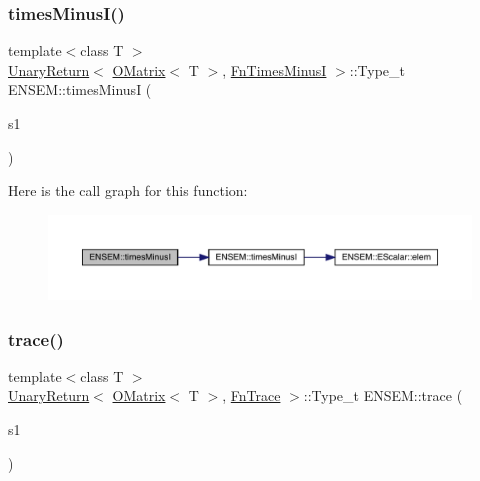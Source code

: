 \subsubsection{\texorpdfstring{timesMinusI()}{timesMinusI()}}
{\footnotesize\ttfamily template$<$class T $>$ \\
\mbox{\hyperlink{structENSEM_1_1UnaryReturn}{Unary\+Return}}$<$ \mbox{\hyperlink{classENSEM_1_1OMatrix}{O\+Matrix}}$<$ T $>$, \mbox{\hyperlink{structENSEM_1_1FnTimesMinusI}{Fn\+Times\+MinusI}} $>$\+::Type\+\_\+t E\+N\+S\+E\+M\+::times\+MinusI (\begin{DoxyParamCaption}\item[{const \mbox{\hyperlink{classENSEM_1_1OMatrix}{O\+Matrix}}$<$ T $>$ \&}]{s1 }\end{DoxyParamCaption})\hspace{0.3cm}{\ttfamily [inline]}}

Here is the call graph for this function\+:\nopagebreak
\begin{figure}[H]
\begin{center}
\leavevmode
\includegraphics[width=350pt]{d8/d55/group__obsmatrix_ga2c4879d53ca01a4233b94574e3c93b4f_cgraph}
\end{center}
\end{figure}
\mbox{\label{group__obsmatrix_gaff7b73c5978746f6706e0cd02f55cc40}} 
\subsubsection{\texorpdfstring{trace()}{trace()}}
{\footnotesize\ttfamily template$<$class T $>$ \\
\mbox{\hyperlink{structENSEM_1_1UnaryReturn}{Unary\+Return}}$<$ \mbox{\hyperlink{classENSEM_1_1OMatrix}{O\+Matrix}}$<$ T $>$, \mbox{\hyperlink{structENSEM_1_1FnTrace}{Fn\+Trace}} $>$\+::Type\+\_\+t E\+N\+S\+E\+M\+::trace (\begin{DoxyParamCaption}\item[{const \mbox{\hyperlink{classENSEM_1_1OMatrix}{O\+Matrix}}$<$ T $>$ \&}]{s1 }\end{DoxyParamCaption})\hspace{0.3cm}{\ttfamily [inline]}}

